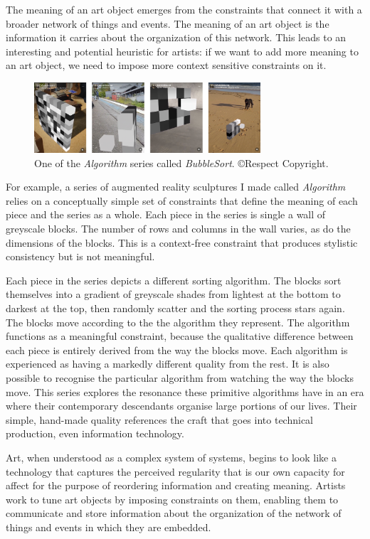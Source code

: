\documentclass[letterpaper]{article}
\begin{document}
    The meaning of an art object emerges from the constraints that connect it with a broader network of things and events. The meaning of an art object is the information it carries about the organization of this network. This leads to an interesting and potential heuristic for artists: if we want to add more meaning to an art object, we need to impose more context sensitive constraints on it.

    \begin{figure}[h]
    \includegraphics[width=3.31in]{bubble-sort.png}
    \caption{One of the \emph{Algorithm} series called \emph{BubbleSort}. \copyright Respect Copyright.}
    \end{figure}

    For example, a series of augmented reality sculptures I made called \emph{Algorithm} relies on a conceptually simple set of constraints that define the meaning of each piece and the series as a whole. Each piece in the series is single a wall of greyscale blocks. The number of rows and columns in the wall varies, as do the dimensions of the blocks. This is a context-free constraint that produces stylistic consistency but is not meaningful.
    
    Each piece in the series depicts a different sorting algorithm. The blocks sort themselves into a gradient of greyscale shades from lightest at the bottom to darkest at the top, then randomly scatter and the sorting process stars again. The blocks move according to the the algorithm they represent. The algorithm functions as a meaningful constraint, because the qualitative difference between each piece is entirely derived from the way the blocks move. Each algorithm is experienced as having a markedly different quality from the rest. It is also possible to recognise the particular algorithm from watching the way the blocks move. This series explores the resonance these primitive algorithms have in an era where their contemporary descendants organise large portions of our lives. Their simple, hand-made quality references the craft that goes into technical production, even information technology.

    Art, when understood as a complex system of systems, begins to look like a technology that captures the perceived regularity that is our own capacity for affect for the purpose of reordering information and creating meaning. Artists work to tune art objects by imposing constraints on them, enabling them to communicate and store information about the organization of the network of things and events in which they are embedded.
\end{document}

